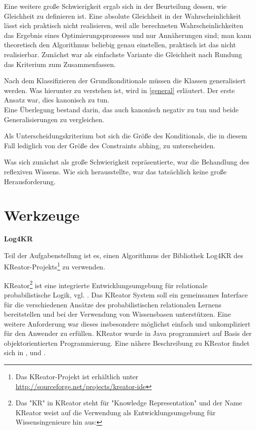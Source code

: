 \documentclass[draft]{scrreprt}
\begin{document}
Eine weitere große Schwierigkeit ergab sich in der Beurteilung dessen, wie Gleichheit zu definieren ist. Eine absolute Gleichheit in der Wahrscheinlichkeit lässt sich praktisch nicht realisieren, weil alle berechneten Wahrscheinlichkeiten das Ergebnis eines Optimierungsprozesses und nur Annäherungen sind; man kann theoretisch den Algorithmus beliebig genau einstellen, praktisch ist das nicht realisierbar. Zunächst war als einfachste Variante die Gleichheit nach Rundung das Kriterium zum Zusammenfassen.

Nach dem Klassifizieren der Grundkonditionale müssen die Klassen generalisiert werden. Was hierunter zu verstehen ist, wird in \ref{general} erläutert. 
Der erste Ansatz war, dies kanonisch zu tun.\\
Eine Überlegung bestand darin, das auch kanonisch negativ zu tun und beide Generalisierungen zu vergleichen.

Als Unterscheidungskriterium bot sich die Größe des Konditionals, die in diesem Fall lediglich von der Größe des Constraints abhing, zu unterscheiden.

Was sich zunächst als große Schwierigkeit repräsentierte, war die Behandlung des reflexiven Wissens. Wie sich herausstellte, war das tatsächlich keine große Herausforderung. 





\section{Werkzeuge}

\textbf{Log4KR}

Teil der Aufgabenstellung ist es, einen Algorithmus der Bibliothek Log4KR des \\ KReator-Projekts\footnote{Das KReator-Projekt ist erhältlich unter \href{http://sourceforge.net/projects/kreator-ide}{http://sourceforge.net/projects/kreator-ide}} zu verwenden.

KReator\footnote{Das "{}KR"{} in KReator steht für "{}Knowledge Representation"{} und der Name KReator weist auf die Verwendung als Entwicklungsumgebung für Wissensingenieure hin aus:\cite{FLT09}} ist eine integrierte Entwicklungsumgebung für relationale probabilistische Logik, vgl. \cite{BHM14}. Das KReator System soll ein gemeinsames Interface für die verschiedenen Ansätze des probabilistischen relationalen Lernens bereitstellen und bei der Verwendung von Wissensbasen unterstützen. Eine weitere Anforderung war dieses insbesondere möglichst einfach und unkompliziert für den Anwender zu erfüllen. KReator wurde in Java programmiert auf Basis der objektorientierten Programmierung. Eine nähere Beschreibung zu KReator findet sich in \cite{TFLKIB10}, \cite{KIBFT11} und \cite{FLT09}.
\end{document}
